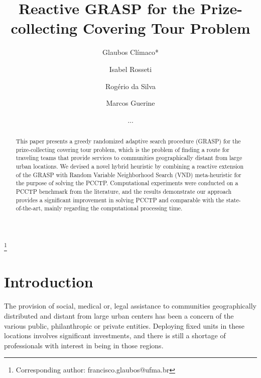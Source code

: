 \documentclass{ro}
\begin{document}
\title{Reactive GRASP for the Prize-collecting Covering Tour Problem}%
%
\author{Glaubos Cl\'imaco*}\address{Universidade Federal do Maranhão, Av. dos Portugueses, 1966 - Vila Bacanga, Sao Lu\'is, Brasil.}\thanks{Corresponding author: francisco.glaubos@ufma.br}

\author{Isabel Rosseti}\address{ Universidade Federal Fluminense, Instituto de Computa\c{c}\~ao. Rua Passo da P\'atria 156 S\~ao Domingos 24210-240 - Niter\'oi, RJ - Brasil}

\author{Rog\'erio da Silva}\address{Institute of Education, Science and Technology of Piau\'i.R. Alvaro Mendes, 94 - Centro (Sul), Teresina - Brasil}

\author{Marcos Guerine}\address{Federal Institute of Education, Science and Technology of Rio de Janeiro.  Rua Jos\'e Breves, 550, Centro, Pinheiral, RJ, Brazil}


%
\date{...}
%
\begin{abstract} 

This paper presents a greedy randomized adaptive search procedure (GRASP) for the prize-collecting covering tour problem, which is the problem
of finding a route for traveling teams that provide services to communities geographically distant from large urban locations. We devised a novel hybrid heuristic by combining a reactive extension of the GRASP with Random Variable Neighborhood Search (VND) meta-heuristic for the purpose of solving the PCCTP. Computational experiments were conducted on a PCCTP benchmark from the literature, and the results demonstrate our approach provides a significant improvement in solving PCCTP and comparable with the state-of-the-art, mainly regarding the computational processing time.

 \end{abstract}
%


%
%
\maketitle


\section{Introduction}
\label{sec:intro}
The provision of social, medical or, legal assistance to communities geographically distributed and distant from large urban centers has been a concern of the various public, philanthropic or private entities. Deploying fixed units in these locations involves significant investments, and there is still a shortage of professionals with interest in being in those regions.
\end{document}
